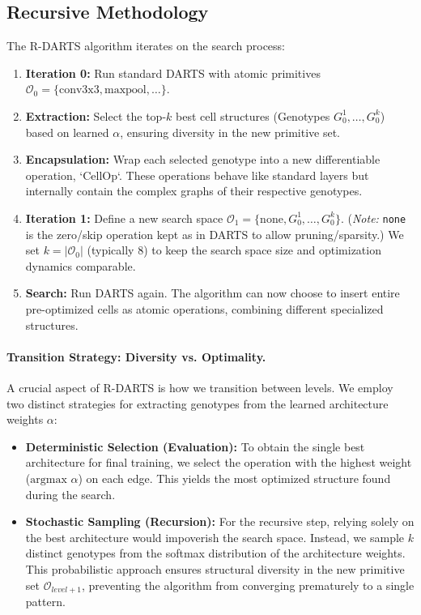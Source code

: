 \documentclass[a4paper,11pt]{article}
\begin{document}
\subsection{Recursive Methodology}
The R-DARTS algorithm iterates on the search process:
\begin{enumerate}
    \item \textbf{Iteration 0:} Run standard DARTS with atomic primitives $\mathcal{O}_0 = \{\text{conv3x3}, \text{maxpool}, \dots\}$.
    \item \textbf{Extraction:} Select the top-$k$ best cell structures (Genotypes $G_0^1, \dots, G_0^k$) based on learned $\alpha$, ensuring diversity in the new primitive set.
    \item \textbf{Encapsulation:} Wrap each selected genotype into a new differentiable operation, `CellOp`. These operations behave like standard layers but internally contain the complex graphs of their respective genotypes.
    \item \textbf{Iteration 1:} Define a new search space $\mathcal{O}_1 = \{\text{none}, G_0^1, \dots, G_0^k\}$. (\textit{Note:} \texttt{none} is the zero/skip operation kept as in DARTS to allow pruning/sparsity.) We set $k = |\mathcal{O}_0|$ (typically 8) to keep the search space size and optimization dynamics comparable.
    \item \textbf{Search:} Run DARTS again. The algorithm can now choose to insert entire pre-optimized cells as atomic operations, combining different specialized structures.
\end{enumerate}

\paragraph{Transition Strategy: Diversity vs. Optimality.}
A crucial aspect of R-DARTS is how we transition between levels. We employ two distinct strategies for extracting genotypes from the learned architecture weights $\alpha$:
\begin{itemize}
    \item \textbf{Deterministic Selection (Evaluation):} To obtain the single best architecture for final training, we select the operation with the highest weight ($\text{argmax } \alpha$) on each edge. This yields the most optimized structure found during the search.
    \item \textbf{Stochastic Sampling (Recursion):} For the recursive step, relying solely on the best architecture would impoverish the search space. Instead, we sample $k$ distinct genotypes from the softmax distribution of the architecture weights. This probabilistic approach ensures structural diversity in the new primitive set $\mathcal{O}_{level+1}$, preventing the algorithm from converging prematurely to a single pattern.
\end{itemize}
\end{document}
